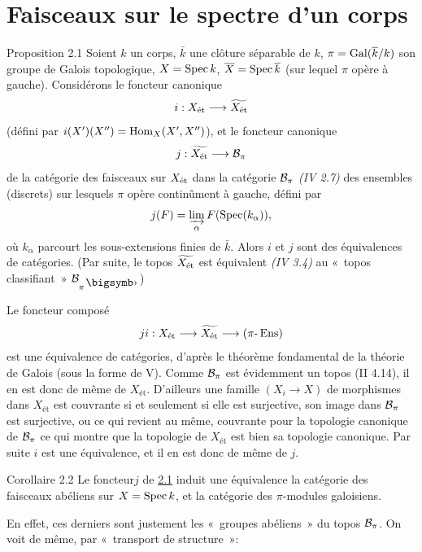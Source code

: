 \documentclass[10pt]{../fichiers-configuration-latex/smfart}
\begin{document}
\section{Faisceaux sur le spectre d'un corps}\pageoriginale

\begin{enonce*}{Proposition 2.1}
Soient $k$ un corps, $\bar{k}$ une clôture séparable
de $k$, $\pi = \operatorname{Gal} (\overline{k}/k)$ son groupe de Galois topologique,
$X = \operatorname{Spec} k$, $\overline{X} = \operatorname{Spec} \overline{k}$ (sur lequel $\pi$ opère à
gauche). Considérons le foncteur canonique
$$
i : X_{\text{\rm ét}} \to \widetilde{X_{\text{\rm ét}}}
$$
(défini par $i(X')(X'') = \operatorname{Hom}_X (X', X'')$), et le foncteur canonique
$$
j : \widetilde{X_{\text{\rm ét}}} \to \Bb_{\pi}
$$
de la catégorie des faisceaux sur $X_{\text{\rm ét}}$ dans la catégorie
${\mathcal B}_{\pi}$ \emph{(\cf IV 2.7)} des ensembles (discrets) sur lesquels
$\pi$ opère continûment à gauche, défini par
$$
j(F) = \varinjlim_{\alpha} F(\operatorname{Spec}(k_{\alpha})){},
$$
où $k_{\alpha}$ parcourt les sous-extensions finies de
$\bar{k}$. Alors $i$ et $j$ sont des équivalences de catégories. (Par
suite, le topos $\widetilde{X_{\text{\rm ét}}}$ est équivalent
\emph{(IV 3.4)} au
« topos classifiant » $\Bb_{\pi^{\bigdot}}$)
\end{enonce*}

Le foncteur composé
$$
ji : X_{\text{\rm ét}} \to \widetilde{X_{\text{ét}}} \to (\pi\text{-}\Ens)
$$
est une équivalence de catégories, d'après le théorème fondamental
de la théorie de Galois (sous la forme de  V). Comme
${\mathcal B}_{\pi}$ est évidemment un topos (II 4.14), il en est donc de
même de $X_{\text{ét}}$. D'ailleurs une famille $(X_i \to X)$ de
morphismes dans $X_{\text{ét}}$ est couvrante si et seulement si
elle est surjective, \ie son image dans ${\mathcal B}_{\pi}$ est surjective,
ou ce qui revient au même, couvrante pour la topologie canonique de
${\mathcal B}_{\pi}$ ce qui montre que la topologie de $X_{\text{ét}}$ est
bien sa topologie canonique. Par suite $i$ est une équivalence, et
il en est donc de même de $j$.

\begin{enonce*}{Corollaire 2.2}
Le foncteur\pageoriginale  $j$ de \hyperref[VIII.prop2.1]{2.1} induit une
équivalence  la catégorie des
faisceaux abéliens sur $X = \operatorname{Spec} k$, et la catégorie des
$\pi$-modules galoisiens.
\end{enonce*}

En effet, ces derniers sont justement les « groupes abéliens »
du topos ${\mathcal B}_{\pi}$. On voit de même, par « transport de
structure »:
\end{document}
